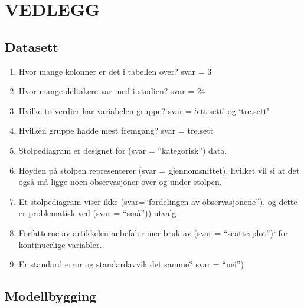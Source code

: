 \documentclass[
]{book}
\providecommand{\tightlist}{%
  \setlength{\itemsep}{0pt}\setlength{\parskip}{0pt}}
\begin{document}
\hypertarget{vedlegg}{%
\chapter{VEDLEGG}\label{vedlegg}}

\hypertarget{datasett-2}{%
\section{Datasett}\label{datasett-2}}

\begin{enumerate}
\def\labelenumi{\alph{enumi}.}
\tightlist
\item
  Hvor mange kolonner er det i tabellen over? svar = 3
\item
  Hvor mange deltakere var med i studien? svar = 24
\item
  Hvilke to verdier har variabelen gruppe? svar = `ett.sett' og `tre.sett'
\item
  Hvilken gruppe hadde mest fremgang? svar = tre.sett
\item
  Stolpediagram er designet for (svar = ``kategorisk'') data.
\item
  Høyden på stolpen representerer (svar = gjennomsnittet), hvilket vil si at det også må ligge noen observasjoner over og under stolpen.
\item
  Et stolpediagram viser ikke (svar=``fordelingen av observasjonene''), og dette er problematisk ved (svar = ``små'')) utvalg
\item
  Forfatterne av artikkelen anbefaler mer bruk av (svar = ``scatterplot'')` for kontinuerlige variabler.
\item
  Er standard error og standardavvik det samme? svar = ``nei'')
\end{enumerate}

\hypertarget{modellbygging}{%
\section{Modellbygging}\label{modellbygging}}
\end{document}

